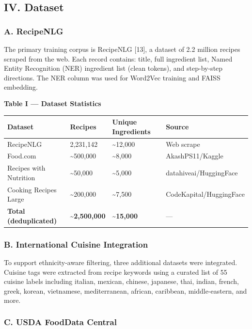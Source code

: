 \documentclass[
  10pt,
]{article}
\begin{document}
\subsection{IV. Dataset}\label{iv.-dataset}

\subsubsection{A. RecipeNLG}\label{a.-recipenlg}

The primary training corpus is RecipeNLG {[}13{]}, a dataset of 2.2
million recipes scraped from the web. Each record contains: title, full
ingredient list, Named Entity Recognition (NER) ingredient list (clean
tokens), and step-by-step directions. The NER column was used for
Word2Vec training and FAISS embedding.

\textbf{Table I --- Dataset Statistics}

\begin{longtable}[]{@{}llll@{}}
\toprule\noalign{}
Dataset & Recipes & Unique Ingredients & Source \\
\midrule\noalign{}
\endhead
\bottomrule\noalign{}
\endlastfoot
RecipeNLG & 2,231,142 & \textasciitilde12,000 & Web scrape \\
Food.com & \textasciitilde500,000 & \textasciitilde8,000 &
AkashPS11/Kaggle \\
Recipes with Nutrition & \textasciitilde50,000 & \textasciitilde5,000 &
datahiveai/HuggingFace \\
Cooking Recipes Large & \textasciitilde200,000 & \textasciitilde7,500 &
CodeKapital/HuggingFace \\
\textbf{Total (deduplicated)} & \textbf{\textasciitilde2,500,000} &
\textbf{\textasciitilde15,000} & --- \\
\end{longtable}

\subsubsection{B. International Cuisine
Integration}\label{b.-international-cuisine-integration}

To support ethnicity-aware filtering, three additional datasets were
integrated. Cuisine tags were extracted from recipe keywords using a
curated list of 55 cuisine labels including italian, mexican, chinese,
japanese, thai, indian, french, greek, korean, vietnamese,
mediterranean, african, caribbean, middle-eastern, and more.

\subsubsection{C. USDA FoodData Central}\label{c.-usda-fooddata-central}
\end{document}
